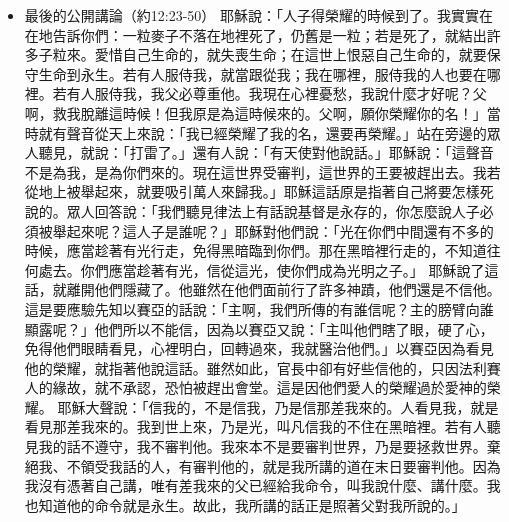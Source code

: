 \begin{itemize}
\begin{itemize}
因為，他們都是自己有餘，拿出來投在裡頭；但這寡婦是自己不足，把他一切養生的都投上了。
\item{路加 21:1-4}
耶穌擡頭觀看，見財主把捐項投在庫裡，又見一個窮寡婦投了兩個小錢，就說：我實在告訴你們，這窮寡婦所投的比眾人還多；因為眾人都是自己有餘，拿出來投在捐項裡，但這寡婦是自己不足，把他一切養生的都投上了。
\item{综合}
耶穌對銀庫坐著抬頭觀看，看眾人怎樣投錢入庫。有好些財主往裡投了若干的錢。有一個窮寡婦來，往裡投了兩個小錢，就是一個大錢。耶穌叫門徒來，說：「我實在告訴你們：這窮寡婦投入庫裡的比眾人所投的更多，因為他們都是自己有餘，拿出來投在裡頭，但這寡婦是自己不足，把她一切養生的都投上了。」
\end{itemize}

\item{最後的公開講論（約12:23-50）}
耶穌說：「人子得榮耀的時候到了。我實實在在地告訴你們：一粒麥子不落在地裡死了，仍舊是一粒；若是死了，就結出許多子粒來。愛惜自己生命的，就失喪生命；在這世上恨惡自己生命的，就要保守生命到永生。若有人服侍我，就當跟從我；我在哪裡，服侍我的人也要在哪裡。若有人服侍我，我父必尊重他。我現在心裡憂愁，我說什麼才好呢？父啊，救我脫離這時候！但我原是為這時候來的。父啊，願你榮耀你的名！」當時就有聲音從天上來說：「我已經榮耀了我的名，還要再榮耀。」站在旁邊的眾人聽見，就說：「打雷了。」還有人說：「有天使對他說話。」耶穌說：「這聲音不是為我，是為你們來的。現在這世界受審判，這世界的王要被趕出去。我若從地上被舉起來，就要吸引萬人來歸我。」耶穌這話原是指著自己將要怎樣死說的。眾人回答說：「我們聽見律法上有話說基督是永存的，你怎麼說人子必須被舉起來呢？這人子是誰呢？」耶穌對他們說：「光在你們中間還有不多的時候，應當趁著有光行走，免得黑暗臨到你們。那在黑暗裡行走的，不知道往何處去。你們應當趁著有光，信從這光，使你們成為光明之子。」
耶穌說了這話，就離開他們隱藏了。他雖然在他們面前行了許多神蹟，他們還是不信他。這是要應驗先知以賽亞的話說：「主啊，我們所傳的有誰信呢？主的膀臂向誰顯露呢？」他們所以不能信，因為以賽亞又說：「主叫他們瞎了眼，硬了心，免得他們眼睛看見，心裡明白，回轉過來，我就醫治他們。」以賽亞因為看見他的榮耀，就指著他說這話。雖然如此，官長中卻有好些信他的，只因法利賽人的緣故，就不承認，恐怕被趕出會堂。這是因他們愛人的榮耀過於愛神的榮耀。
耶穌大聲說：「信我的，不是信我，乃是信那差我來的。人看見我，就是看見那差我來的。我到世上來，乃是光，叫凡信我的不住在黑暗裡。若有人聽見我的話不遵守，我不審判他。我來本不是要審判世界，乃是要拯救世界。棄絕我、不領受我話的人，有審判他的，就是我所講的道在末日要審判他。因為我沒有憑著自己講，唯有差我來的父已經給我命令，叫我說什麼、講什麼。我也知道他的命令就是永生。故此，我所講的話正是照著父對我所說的。」
\end{itemize}


